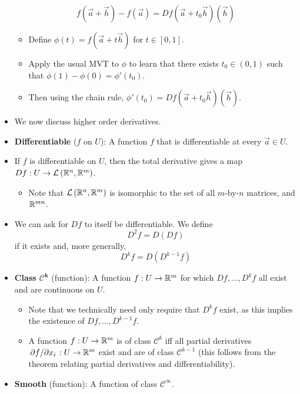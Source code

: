 \documentclass[../notes.tex]{subfiles}
\begin{document}
\begin{itemize}
    \begin{equation*}
        f(\vec{a}+\vec{h})-f(\vec{a}) = Df(\vec{a}+t_0\vec{h})(\vec{h})
    \end{equation*}
    \begin{itemize}
        \item Define $\phi(t)=f(\vec{a}+t\vec{h})$ for $t\in[0,1]$.
        \item Apply the usual MVT to $\phi$ to learn that there exists $t_0\in(0,1)$ such that $\phi(1)-\phi(0)=\phi'(t_0)$.
        \item Then using the chain rule, $\phi'(t_0)=Df(\vec{a}+t_0\vec{h})(\vec{h})$.
    \end{itemize}
    \item We now discuss higher order derivatives.
    \item \textbf{Differentiable} ($f$ on $U$): A function $f$ that is differentiable at every $\vec{a}\in U$.
    \item If $f$ is differentiable on $U$, then the total derivative gives a map $Df:U\to\mathcal{L}\left( \mathbb{R}^n,\mathbb{R}^m \right)$.
    \begin{itemize}
        \item Note that $\mathcal{L}\left( \mathbb{R}^n,\mathbb{R}^m \right)$ is isomorphic to the set of all $m$-by-$n$ matrices, and $\mathbb{R}^{mn}$.
    \end{itemize}
    \item We can ask for $Df$ to itself be differentiable. We define
    \begin{equation*}
        D^2f = D(Df)
    \end{equation*}
    if it exists and, more generally,
    \begin{equation*}
        D^kf = D(D^{k-1}f)
    \end{equation*}
    \item \textbf{Class $\bm{\mathcal{C}^k}$} (function): A function $f:U\to\mathbb{R}^m$ for which $Df,\dots,D^kf$ all exist and are continuous on $U$.
    \begin{itemize}
        \item Note that we technically need only require that $D^kf$ exist, as this implies the existence of $Df,\dots,D^{k-1}f$.
        \item A function $f:U\to\mathbb{R}^m$ is of class $\mathcal{C}^k$ iff all partial derivatives $\pdv*{f}{x_i}:U\to\mathbb{R}^m$ exist and are of class $\mathcal{C}^{k-1}$ (this follows from the theorem relating partial derivatives and differentiability).
    \end{itemize}
    \item \textbf{Smooth} (function): A function of class $\mathcal{C}^\infty$.
\end{itemize}
\end{document}
